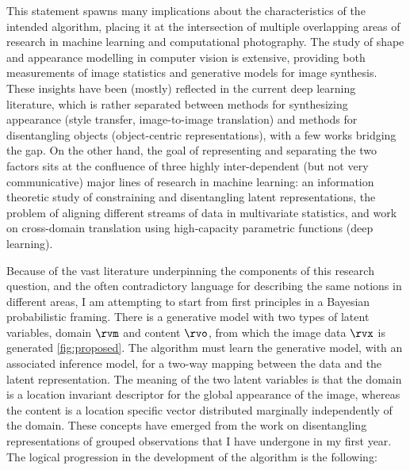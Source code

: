 \documentclass[withindex,glossary,firstyr,times]{cam-thesis}
\begin{document}
This statement spawns many implications about the characteristics of the intended algorithm, placing it at the intersection of multiple overlapping areas of research in machine learning and computational photography. The study of shape and appearance modelling in computer vision is extensive, providing both measurements of image statistics and generative models for image synthesis. These insights have been (mostly) reflected in the current deep learning literature, which is rather separated between methods for synthesizing appearance (style transfer, image-to-image translation) and methods for disentangling objects (object-centric representations), with a few works bridging the gap. On the other hand, the goal of representing and separating the two factors sits at the confluence of three highly inter-dependent (but not very communicative) major lines of research in machine learning: an information theoretic study of constraining and disentangling latent representations, the problem of aligning different streams of data in multivariate statistics, and work on cross-domain translation using high-capacity parametric functions (deep learning).

Because of the vast literature underpinning the components of this research question, and the often contradictory language for describing the same notions in different areas, I am attempting to start from first principles in a Bayesian probabilistic framing. There is a generative model with two types of latent variables, domain $\rvm$ and content $\rvo$, from which the image data $\rvx$ is generated \ref{fig:proposed}. The algorithm must learn the generative model, with an associated inference model, for a two-way mapping between the data and the latent representation. The meaning of the two latent variables is that the domain is a location invariant descriptor for the global appearance of the image, whereas the content is a location specific vector distributed marginally independently of the domain. These concepts have emerged from the work on disentangling representations of grouped observations that I have undergone in my first year. The logical progression in the development of the algorithm is the following:
\end{document}
